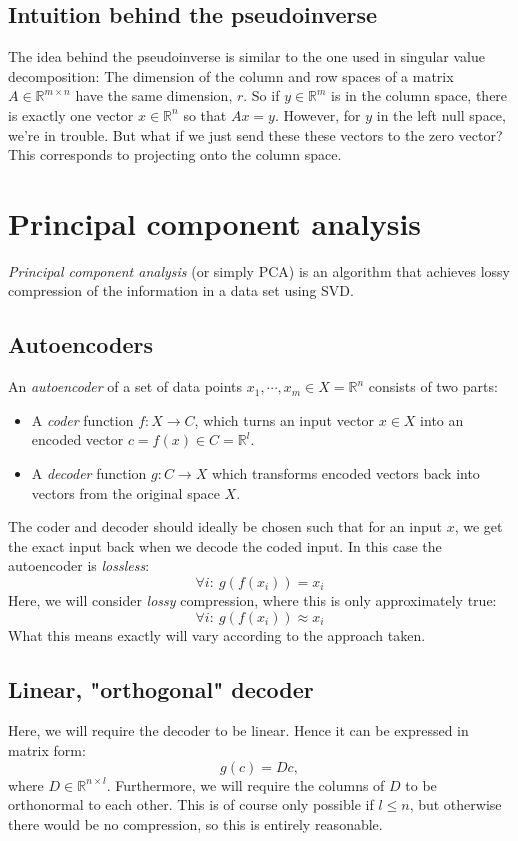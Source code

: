 \documentclass[12pt, a4paper]{article}
\numberwithin{equation}{section}
\begin{document}
\subsection{Intuition behind the pseudoinverse}
The idea behind the pseudoinverse is similar to the one used in singular value decomposition: The dimension of the column and row spaces of a matrix $A\in\mathbb{R}^{m\times n}$ have the same dimension, $r$. So if $y\in\mathbb{R}^m$ is in the column space, there is exactly one vector $x\in\mathbb{R}^n$ so that $Ax=y$. However, for $y$ in the left null space, we're in trouble. But what if we just send these these vectors to the zero vector? This corresponds to projecting onto the column space.


\section{Principal component analysis}
\textit{Principal component analysis} (or simply PCA) is an algorithm that achieves lossy compression of the information in a data set using SVD.

\subsection{Autoencoders}
An \textit{autoencoder} of a set of data points $x_1,\cdots, x_m\in X=\mathbb{R}^n$ consists of two parts:
\begin{itemize}
\item A \textit{coder} function $f: X\rightarrow C$, which turns an input vector $x\in X$ into an encoded vector $c=f(x)\in C=\mathbb{R}^l$.
\item A \textit{decoder} function $g: C\rightarrow X$ which transforms encoded vectors back into vectors from the original space $X$.
\end{itemize}
The coder and decoder should ideally be chosen such that for an input $x$, we get the exact input back when we decode the coded input. In this case the autoencoder is \textit{lossless}:
\begin{equation}
\forall i:\ g(f(x_i))=x_i
\end{equation}
Here, we will consider \textit{lossy} compression, where this is only approximately true:
\begin{equation}
\forall i:\ g(f(x_i))\approx x_i
\end{equation} 
What this means exactly will vary according to the approach taken.

\subsection{Linear, "orthogonal" decoder}
Here, we will require the decoder to be linear. Hence it can be expressed in matrix form:
\begin{equation}
g(c)=Dc,
\end{equation}
where $D\in\mathbb{R}^{n\times l}$. Furthermore, we will require the columns of $D$ to be orthonormal to each other. This is of course only possible if $l\le n$, but otherwise there would be no compression, so this is entirely reasonable.
\end{document}
